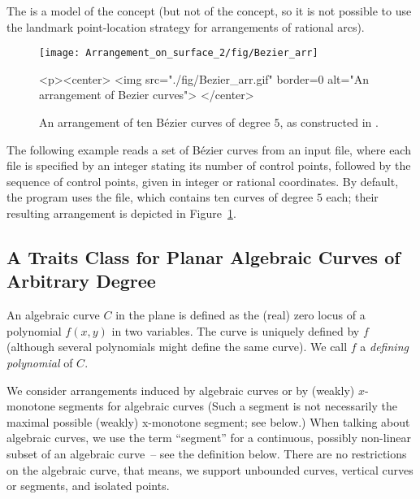 The  is a model of the
 concept (but not of the
 concept, so it is not possible
to use the landmark point-location strategy for arrangements of
rational arcs).

\begin{figure}[t]
\begin{ccTexOnly}
  \begin{center}
  \texttt{[image: Arrangement\_on\_surface\_2/fig/Bezier\_arr]}
  \end{center}
\end{ccTexOnly}
\begin{ccHtmlOnly}
  <p><center>
  <img src="./fig/Bezier_arr.gif" border=0 alt="An arrangement of Bezier curves">
  </center>
\end{ccHtmlOnly}
\caption{An arrangement of ten B\'ezier curves of degree $5$, as
constructed in .\label{arr_fig:ex_bez}}
\end{figure}

The following example reads a set of B\'ezier curves from an input
file, where each file is specified by an integer stating its number
of control points, followed by the sequence of control points, given
in integer or rational coordinates. By default, the program uses
the  file, which contains ten curves of degree $5$
each; their resulting arrangement is depicted in
Figure~\ref{arr_fig:ex_bez}.


\subsection{A Traits Class for Planar Algebraic Curves of Arbitrary Degree
  \label{arr_ssec:tr_alg}}

An algebraic curve $C$ in the plane is defined as the (real) zero locus
of a polynomial $f(x,y)$ in two variables. The curve is uniquely defined
by $f$ (although several polynomials might define the same curve). 
We call $f$ a \emph{defining polynomial} of $C$.

We consider arrangements induced by algebraic curves
or by (weakly) $x$-monotone segments for algebraic curves
(Such a segment is not necessarily the maximal possible 
(weakly) x-monotone segment; see below.)
When talking about algebraic curves, 
we use the term ``segment'' for a continuous, possibly non-linear subset 
of an algebraic curve~-- see the definition below.
There are no restrictions on the algebraic curve, that means, 
we support unbounded curves, vertical curves or segments, and isolated points.

